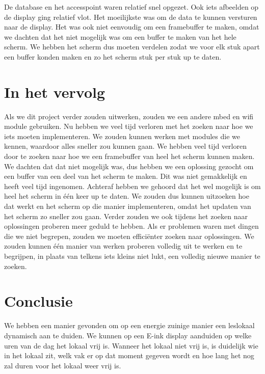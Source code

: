 \documentclass[a4paper,kul]{kulakarticle} %
\begin{document}
De database en het accesspoint waren relatief snel opgezet. Ook iets afbeelden op de display ging relatief vlot. Het moeilijkste was om de data te kunnen versturen naar de display. Het was ook niet eenvoudig om een framebuffer te maken, omdat we dachten dat het niet mogelijk was om een buffer te maken van het hele scherm. We hebben het scherm dus moeten verdelen zodat we voor elk stuk apart een buffer konden maken en zo het scherm stuk per stuk up te daten.

\newpage

\section{In het vervolg}

Als we dit project verder zouden uitwerken, zouden we een andere mbed en wifi module gebruiken. Nu hebben we veel tijd verloren met het zoeken naar hoe we iets moeten implementeren. We zouden kunnen werken met modules die we kennen, waardoor alles sneller zou kunnen gaan. 
\newline
\newline
We hebben veel tijd verloren door te zoeken naar hoe we een framebuffer van heel het scherm kunnen maken. We dachten dat dat niet mogelijk was, dus hebben we een oplossing gezocht om een buffer van een deel van het scherm te maken. Dit was niet gemakkelijk en heeft veel tijd ingenomen. Achteraf hebben we gehoord dat het wel mogelijk is om heel het scherm in één keer up te daten. We zouden dus kunnen uitzoeken hoe dat werkt en het scherm op die manier implementeren, omdat het updaten van het scherm zo sneller zou gaan. 
\newline
\newline
Verder zouden we ook tijdens het zoeken naar oplossingen proberen meer geduld te hebben. Als er problemen waren met dingen die we niet begrepen, zouden we moeten efficiënter zoeken naar oplossingen. We zouden kunnen één manier van werken proberen volledig uit te werken en te begrijpen, in plaats van telkens iets kleins niet lukt, een volledig nieuwe manier te zoeken.

\newpage

\section{Conclusie}

We hebben een manier gevonden om op een energie zuinige manier een leslokaal dynamisch aan te duiden. We kunnen op een E-ink display aanduiden op welke uren van de dag het lokaal vrij is. Wanneer het lokaal niet vrij is, is duidelijk wie in het lokaal zit, welk vak er op dat moment gegeven wordt en hoe lang het nog zal duren voor het lokaal  weer vrij is.

\newpage



\end{document}
